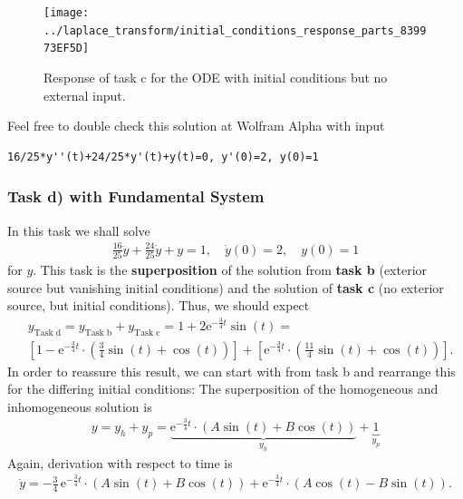 \documentclass[11pt,a4paper,DIV=12]{scrartcl}
\begin{document}
\begin{figure}[h!]
\centering
\texttt{[image: ../laplace\_transform/initial\_conditions\_response\_parts\_839973EF5D]}
\caption{Response of task c for the ODE with initial conditions but no external input.}
\label{fig:initial_conditions_response_parts}
\end{figure}

Feel free to double check this solution at Wolfram Alpha with input
\begin{verbatim}
16/25*y''(t)+24/25*y'(t)+y(t)=0, y'(0)=2, y(0)=1
\end{verbatim}



\subsubsection{Task d) with Fundamental System}
In this task we shall solve
\begin{align}
\frac{16}{25} \ddot{y} + \frac{24}{25} \dot{y} + y = 1, \quad
\dot{y}(0) = 2,\quad y(0)=1
\end{align}
for $y$.
%
This task is the \textbf{superposition} of the solution from \textbf{task b} (exterior source
but vanishing initial conditions) and the solution of \textbf{task c} (no exterior
source, but initial conditions). Thus, we should expect
\begin{align}
&y_\text{Task d} =
y_\text{Task b} +
y_\text{Task c} = 1 + 2\mathrm{e}^{-\frac{3}{4} t} \sin(t) = \nonumber\\
&\left[1 - \mathrm{e}^{-\frac{3}{4} t} \cdot
\left( \frac{3}{4} \sin(t) + \cos(t)\right)\right]
+\left[\mathrm{e}^{-\frac{3}{4} t} \cdot
\left( \frac{11}{4} \sin(t) + \cos(t)\right)\right].
\end{align}
%
In order to reassure this result, we can start with  from
task b and rearrange this for the differing initial conditions:
The superposition of the homogeneous and inhomogeneous solution is
\begin{align}
y = y_h + y_p = \underbrace{
\mathrm{e}^{-\frac{3}{4} t} \cdot
\left( A \sin(t) + B \cos(t)\right)}_{y_h} + \underbrace{1}_{y_p}
\end{align}
Again, derivation with respect to time is
\begin{align}
\dot{y}
=
-\frac{3}{4}\,\mathrm{e}^{-\frac{3}{4} t} \cdot
\left( A \sin(t) + B \cos(t)\right)
+
\mathrm{e}^{-\frac{3}{4} t} \cdot
\left( A \cos(t)  - B \sin(t)\right).
\end{align}
\end{document}
